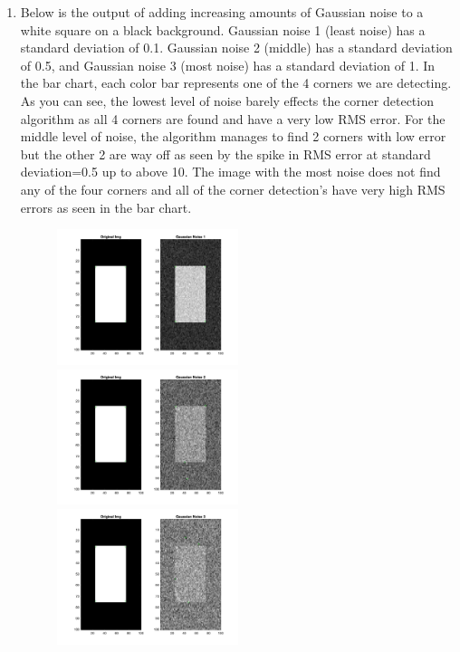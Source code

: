 \documentclass[12pt]{article}
\begin{document}
\begin{enumerate}
\begin{enumerate}
		
		\item Below is the output of adding increasing amounts of Gaussian noise to a white square on a black background. Gaussian noise 1 (least noise) has a standard deviation of 0.1. Gaussian noise 2 (middle) has a standard deviation of 0.5, and Gaussian noise 3 (most noise) has a standard deviation of 1. In the bar chart, each color bar represents one of the 4 corners we are detecting. As you can see, the lowest level of noise barely effects the corner detection algorithm as all 4 corners are found and have a very low RMS error. For the middle level of noise, the algorithm manages to find 2 corners with low error but the other 2 are way off as seen by the spike in RMS error at standard deviation=0.5 up to above 10. The image with the most noise does not find any of the four corners and all of the corner detection's have very high RMS errors as seen in the bar chart.
		\begin{figure}[H]
			\includegraphics[width=0.5\textwidth]{Q6C_gaussian1_results.jpg}
			\includegraphics[width=0.5\textwidth]{Q6C_gaussian2_results.jpg}
			\includegraphics[width=0.5\textwidth]{Q6C_gaussian3_results.jpg}

\end{figure}
\end{enumerate}
\end{enumerate}
\end{document}
